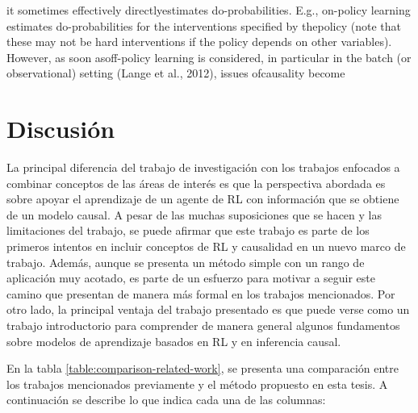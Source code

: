 it sometimes effectively directlyestimates do-probabilities.  E.g., on-policy learning estimates do-probabilities for the interventions specified by thepolicy (note that these may not be hard interventions if the policy depends on other variables). However, as soon asoff-policy learning is considered, in particular in the batch (or observational) setting (Lange et al., 2012), issues ofcausality become

\section{Discusión}

La principal diferencia del trabajo de investigación con los trabajos enfocados a combinar conceptos de las áreas de interés es que la perspectiva abordada es sobre apoyar el aprendizaje de un agente de RL con información que se obtiene de un modelo causal. A pesar de las muchas suposiciones que se hacen y las limitaciones del trabajo, se puede afirmar que este trabajo es parte de los primeros intentos en incluir conceptos de RL y causalidad en un nuevo marco de trabajo. Además, aunque se presenta un método simple con un rango de aplicación muy acotado, es parte de un esfuerzo para motivar a seguir este camino que presentan de manera más formal en los trabajos mencionados. Por otro lado, la principal ventaja del trabajo presentado es que puede verse como un trabajo introductorio para comprender de manera general algunos fundamentos sobre modelos de aprendizaje basados en RL y en inferencia causal.

En la tabla \ref{table:comparison-related-work}, se presenta una comparación entre los trabajos mencionados previamente y el método propuesto en esta tesis. A continuación se describe lo que indica cada una de las columnas:

